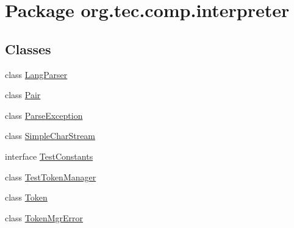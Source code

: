 \hypertarget{namespaceorg_1_1tec_1_1comp_1_1interpreter}{}\section{Package org.\+tec.\+comp.\+interpreter}
\label{namespaceorg_1_1tec_1_1comp_1_1interpreter}
\subsection*{Classes}
\begin{DoxyCompactItemize}
\item 
class \mbox{\hyperlink{classorg_1_1tec_1_1comp_1_1interpreter_1_1_lang_parser}{Lang\+Parser}}
\item 
class \mbox{\hyperlink{classorg_1_1tec_1_1comp_1_1interpreter_1_1_pair}{Pair}}
\item 
class \mbox{\hyperlink{classorg_1_1tec_1_1comp_1_1interpreter_1_1_parse_exception}{Parse\+Exception}}
\item 
class \mbox{\hyperlink{classorg_1_1tec_1_1comp_1_1interpreter_1_1_simple_char_stream}{Simple\+Char\+Stream}}
\item 
interface \mbox{\hyperlink{interfaceorg_1_1tec_1_1comp_1_1interpreter_1_1_test_constants}{Test\+Constants}}
\item 
class \mbox{\hyperlink{classorg_1_1tec_1_1comp_1_1interpreter_1_1_test_token_manager}{Test\+Token\+Manager}}
\item 
class \mbox{\hyperlink{classorg_1_1tec_1_1comp_1_1interpreter_1_1_token}{Token}}
\item 
class \mbox{\hyperlink{classorg_1_1tec_1_1comp_1_1interpreter_1_1_token_mgr_error}{Token\+Mgr\+Error}}
\end{DoxyCompactItemize}
